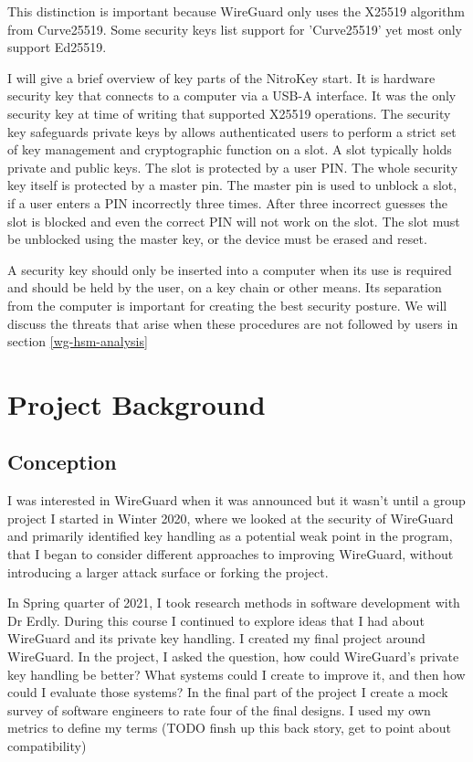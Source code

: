 \documentclass [11pt, proquest] {uwthesis}[2020/02/24]
\begin{document}
This distinction is important because WireGuard only uses the X25519 algorithm from Curve25519. Some security keys list support for 'Curve25519' yet most only support Ed25519.

I will give a brief overview of key parts of the NitroKey start. It is hardware security key that connects to a computer via a USB-A interface. It was the only security key at time of writing that supported X25519 operations.
The security key safeguards private keys by allows authenticated users to perform a strict set of key management and cryptographic function on a slot. A slot typically holds private and public keys. The slot is protected by a user PIN. The whole security key itself is protected by a master pin. The master pin is used to unblock a slot, if a user enters a PIN incorrectly three times. After three incorrect guesses the slot is blocked and even the correct PIN will not work on the slot. The slot must be unblocked using the master key, or the device must be erased and reset.

A security key should only be inserted into a computer when its use is required and should be held by the user, on a key chain or other means. Its separation from the computer is important for creating the best security posture. We will discuss the threats that arise when these procedures are not followed by users in section \ref{wg-hsm-analysis}

\chapter {Project Background}

\section {Conception}
I was interested in WireGuard when it was announced but it wasn't until a group project I started in Winter 2020, where we looked at the security of WireGuard and primarily identified key handling as a potential weak point in the program, that I began to consider different approaches to improving WireGuard,  without introducing a larger attack surface or forking the project. 

In Spring quarter of 2021, I took research methods in software development with Dr Erdly. During this course I continued to explore ideas that I had about WireGuard and its private key handling. I created my final project around WireGuard. In the project, I asked the question, how could WireGuard's private key handling be better? What systems could I create to improve it, and then how could I evaluate those systems?  
In the final part of the project I create a mock survey of software engineers to rate four of the final designs. I used my own metrics to define my terms (TODO finsh up this back story, get to point about compatibility)
\end{document}
